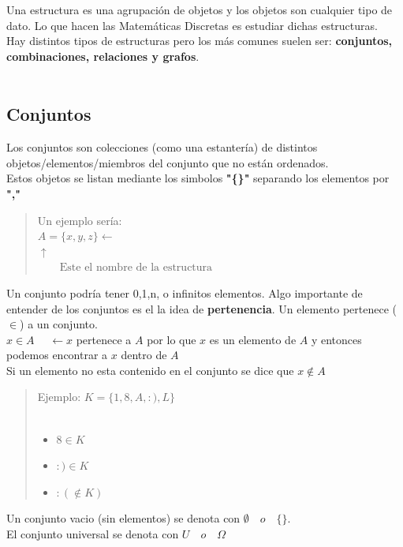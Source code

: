 \documentclass{article}
\begin{document}
Una estructura es una agrupación de objetos y los objetos son cualquier tipo
de dato.
Lo que hacen las Matemáticas Discretas es estudiar dichas estructuras.\\
Hay distintos tipos de estructuras pero los más comunes suelen ser:
\textbf{conjuntos, combinaciones, relaciones y grafos}.\\\\

\subsection{Conjuntos}

Los conjuntos son colecciones (como una estantería) de distintos
objetos/elementos/miembros del conjunto que no están ordenados.\\

Estos objetos se listan mediante los simbolos \textbf{"\{\}"}
separando los elementos por \textbf{","}

\begin{quote}
    Un ejemplo sería:\\
    $ A = \{x, y, z\} \leftarrow$  \\
    $\uparrow $\\
    $\qquad \text{Este el nombre de la estructura}$ \\
\end{quote}

Un conjunto podría tener 0,1,n, o infinitos elementos.
Algo importante de entender de los conjuntos es el la idea de \textbf{pertenencia}.
Un elemento pertenece ($\in $) a un conjunto.\\

\textbf{$x \in A \quad$} $\leftarrow  x$ pertenece a $A$ por lo que $x$ es un elemento
de $A$ y entonces podemos encontrar a $x$ dentro de $A$\\

Si un elemento no esta contenido en el conjunto se dice que \textbf{$x \notin A$}\\

\begin{quote}
    Ejemplo:
    $K = \{1, 8, A, :), L\}$\\\\
    \begin{itemize}
        \item $8 \in K$\\
        \item $:) \in K$\\
        \item $:( \notin K)$\\
    \end{itemize}
\end{quote}
Un conjunto vacio (sin elementos) se denota con $ \emptyset \quad o \quad \{\}$.\\
El conjunto universal se denota con $ U \quad o \quad \Omega$
\end{document}
